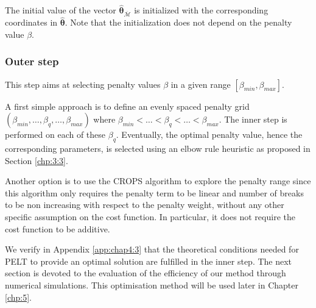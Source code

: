 The initial value of the vector $\widehat{\bm\theta}_{\overline{\mathcal{M}}}$ is initialized with the corresponding coordinates in $\widehat{\bm\theta}$. Note that the initialization does not depend on the penalty value $\beta$. 


\subsubsection{Outer step}\label{chp:4:3:2:2}

This step aims at selecting penalty values $\beta$ in a given range $[\beta_{min},\beta_{max}]$.

A first simple approach is to define an evenly spaced penalty grid $(\beta_{min},\dots,\beta_q,\dots,\beta_{max})$ where $\beta_{min}<\dots<\beta_{q}<\dots<\beta_{max}$. The inner step is performed on each of these $\beta_{q}$. Eventually, the optimal penalty value, hence the corresponding parameters, is selected using an elbow rule heuristic as proposed in Section \ref{chp:3:3}.

Another option is to use the CROPS algorithm to explore the penalty range since this algorithm only requires the penalty term to be linear and number of breaks to be non increasing with respect to the penalty weight, without any other specific assumption on the cost function. In particular, it does not require the cost function to be additive. 
\newline
\newline

We verify in Appendix \ref{app:chap4:3} that the theoretical conditions needed for PELT to provide an optimal solution are fulfilled in the inner step. The next section is devoted to the evaluation of the efficiency of our method through numerical simulations. This optimisation method will be used later in Chapter \ref{chp:5}.


